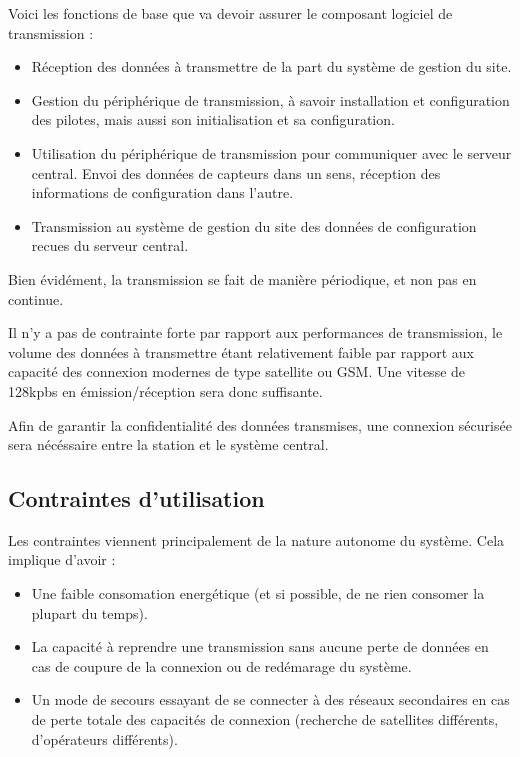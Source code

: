 Voici les fonctions de base que va devoir assurer le composant logiciel de transmission :

\begin{itemize}
\item Réception des données à transmettre de la part du système de gestion du site.
\item Gestion du périphérique de transmission, à savoir installation et configuration des pilotes, mais aussi son initialisation et sa configuration.
\item Utilisation du périphérique de transmission pour communiquer avec le serveur central. Envoi des données de capteurs dans un sens, réception des informations de configuration dans l'autre.
\item Transmission au système de gestion du site des données de configuration recues du serveur central.
\end{itemize}

Bien évidément, la transmission se fait de manière périodique, et non pas en continue.

Il n'y a pas de contrainte forte par rapport aux performances de transmission, le volume des données à transmettre étant relativement faible par rapport aux capacité des connexion modernes de type satellite ou GSM. Une vitesse de 128kpbs en émission/réception sera donc suffisante.

Afin de garantir la confidentialité des données transmises, une connexion sécurisée sera nécéssaire entre la station et le système central.

\subsection{Contraintes d'utilisation}

Les contraintes viennent principalement de la nature autonome du système. Cela implique d'avoir :

\begin{itemize}
\item Une faible consomation energétique (et si possible, de ne rien consomer la plupart du temps).
\item La capacité à reprendre une transmission sans aucune perte de données en cas de coupure de la connexion ou de redémarage du système.
\item Un mode de secours essayant de se connecter à des réseaux secondaires en cas de perte totale des capacités de connexion (recherche de satellites différents, d'opérateurs différents).
\end{itemize}

